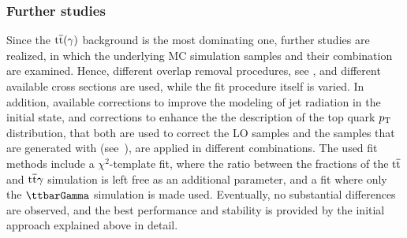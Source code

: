 \subsubsection*{Further studies}
Since the ${\mathrm{t}\overline{\mathrm{t}}}(\gamma)$ background is the most dominating one, further studies are realized, in which the underlying MC simulation samples and their combination are examined. Hence, different overlap removal procedures, see , and different available cross sections are used, while the fit procedure itself is varied. In addition, available corrections to improve the modeling of jet radiation in the initial state, and corrections to enhance the the description of the top quark $p_{\mathrm{T}}$ distribution, that both are used to correct the LO samples and the samples that are generated with \POWHEG (see~), are applied in different combinations. The used fit methods include a $\chi^2$-template fit, where the ratio between the fractions of the ${\mathrm{t}\overline{\mathrm{t}}}$ and ${\mathrm{t}\overline{\mathrm{t}}}\gamma$ simulation is left free as an additional parameter, and a fit where only the $\ttbarGamma$ simulation is made used. Eventually, no substantial differences are observed, and the best performance and stability is provided by the initial approach explained above in detail.



